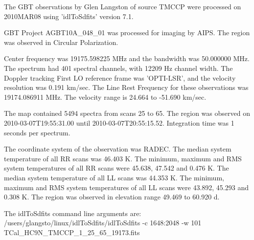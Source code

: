 The GBT observations by Glen Langston of source TMCCP
were processed on 2010MAR08 using 'idlToSdfits' version 7.1.

GBT Project AGBT10A_048_01 was processed for imaging by AIPS.
The region was observed in Circular Polarization.

Center frequency was 19175.598225 MHz and the bandwidth was 50.000000 MHz.
The spectrum had 401 spectral channels, with 12209 Hz channel width.
The Doppler tracking First LO reference frame was 'OPTI-LSR',
and the velocity resolution was 0.191 km/sec.
The Line Rest Frequency for these observations was 19174.086911 MHz.
The velocity range is 24.664 to -51.690 km/sec.

The map contained 5494 spectra from scans 25 to 65.
The region was observed on 2010-03-07T19:55:31.00 until 2010-03-07T20:55:15.52.
Integration time was 1 seconds per spectrum.

The coordinate system of the observation was RADEC.
The median system temperature of all RR scans was 46.403 K.
The minimum, maximum and RMS system temperatures of 
all RR scans were 45.638, 47.542 and 0.476 K.
The median system temperature of all LL scans was 44.353 K.
The minimum, maximum and RMS system temperatures of 
all LL scans were 43.892, 45.293 and 0.308 K.
The region was observed in elevation range 49.469 to 60.920 d.

The idlToSdfits command line arguments are:
/users/glangsto/linux/idlToSdfits/idlToSdfits -c 1648:2048 -w 101 TCal_HC9N_TMCCP_1_25_65_19173.fits 
